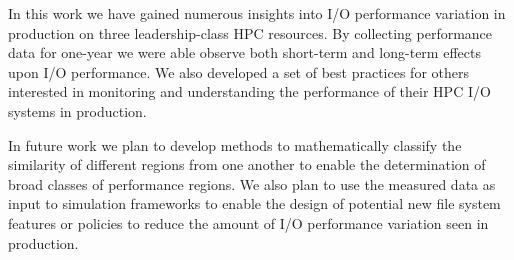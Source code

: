 
In this work we have gained numerous insights into I/O performance variation
in production on three leadership-class HPC resources. By collecting
performance data for one-year we were able observe both short-term and
long-term effects upon I/O performance. We also developed a set of best
practices for others interested in monitoring and understanding the performance of their HPC I/O systems in production.


In future work we plan to develop methods to mathematically classify the similarity of different regions from one another to enable the determination of broad classes of performance regions. We also plan to use the measured data as input to simulation frameworks to enable the design of potential new file system features or policies to reduce the  amount of I/O performance variation seen in production. 

\endinput

